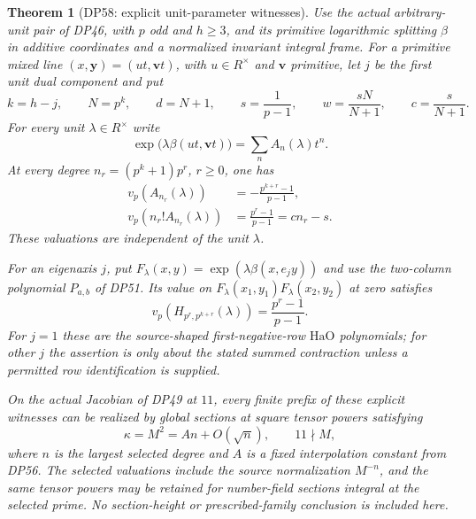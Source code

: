 \documentclass[11pt,a4paper]{article}
\newtheorem{theorem}{Theorem}[section]
\theoremstyle{definition}\newtheorem{remark}[theorem]{Remark}
\begin{document}
\begin{theorem}[DP58: explicit unit-parameter witnesses]\label{DP58}
Use the actual arbitrary-unit pair of DP46, with $p$ odd and $h\ge3$, and its primitive logarithmic splitting $\beta$ in additive coordinates and a normalized invariant integral frame.
For a primitive mixed line $(x,\mathbf y)=(ut,\mathbf vt)$, with $u\in R^\times$ and $\mathbf v$ primitive, let $j$ be the first unit dual component and put
\[
 k=h-j,\qquad N=p^k,\qquad d=N+1,\qquad
 s=\frac1{p-1},\qquad
 w=\frac{sN}{N+1},\qquad c=\frac{s}{N+1}.
\]
For every unit $\lambda\in R^\times$ write
\[
 \exp\bigl(\lambda\beta(ut,\mathbf vt)\bigr)
 =\sum_n A_n(\lambda)t^n.
\]
At every degree $n_r=(p^k+1)p^r$, $r\ge0$, one has
\begin{align}
 v_p(A_{n_r}(\lambda))
 &=-\frac{p^{k+r}-1}{p-1},\label{eq:explicitkernelcoefficient}\\
 v_p(n_r!A_{n_r}(\lambda))
 &=\frac{p^r-1}{p-1}=cn_r-s.\label{eq:explicitkerneljet}
\end{align}
These valuations are independent of the unit $\lambda$.

For an eigenaxis $j$, put
$F_\lambda(x,y)=\exp(\lambda\beta(x,e_jy))$ and use the two-column polynomial $P_{a,b}$ of DP51.
Its value on $F_\lambda(x_1,y_1)F_\lambda(x_2,y_2)$ at zero satisfies
\begin{equation}\label{eq:explicitharmonicjet}
 v_p(H_{p^r,p^{k+r}}(\lambda))
 =\frac{p^r-1}{p-1}.
\end{equation}
For $j=1$ these are the source-shaped first-negative-row $\mathrm{HaO}$ polynomials; for other $j$ the assertion is only about the stated summed contraction unless a permitted row identification is supplied.

On the actual Jacobian of DP49 at $11$, every finite prefix of these explicit witnesses can be realized by global sections at square tensor powers satisfying
\[
 \kappa=M^2=An+O(\sqrt n),\qquad 11\nmid M,
\]
where $n$ is the largest selected degree and $A$ is a fixed interpolation constant from DP56.
The selected valuations include the source normalization $M^{-n}$, and the same tensor powers may be retained for number-field sections integral at the selected prime.
No section-height or prescribed-family conclusion is included here.
\end{theorem}
\end{document}
